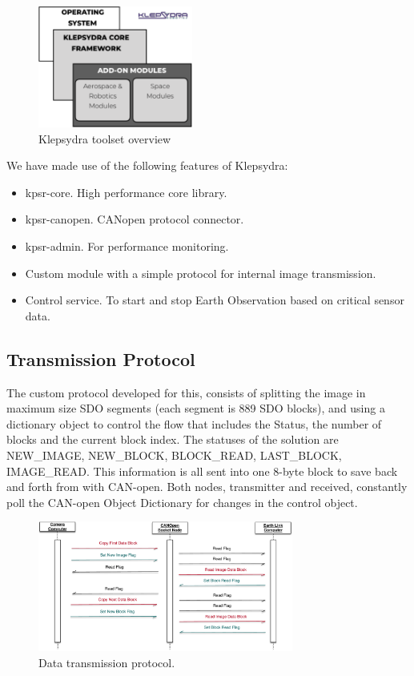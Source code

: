 \documentclass[a4paper,twocolumn]{esapub2005} %
\begin{document}
\begin{figure}[!h]
\centering
\includegraphics[width = 2in]{images/klepsydra_overview}
\caption{Klepsydra toolset overview\label{fig:kpsr_over}}
\end{figure}

We have made use of the following features of Klepsydra:

\begin{itemize}
\item kpsr-core. High performance core library.
\item kpsr-canopen. CANopen protocol connector.
\item kpsr-admin. For performance monitoring.
\item Custom module with a simple protocol for internal image transmission.
\item Control service. To start and stop Earth Observation based on critical sensor data.
\end{itemize}

\subsection{Transmission Protocol}
The custom protocol developed for this, consists of splitting the image in maximum size SDO segments (each segment is 889 SDO blocks), and using a dictionary object to control the flow that includes the Status, the number of blocks and the current block index. The statuses of the solution are NEW\_IMAGE, NEW\_BLOCK, BLOCK\_READ, LAST\_BLOCK, IMAGE\_READ. This information is all sent into one 8-byte block to save back and forth from with CAN-open. Both nodes, transmitter and received, constantly poll the CAN-open Object Dictionary for changes in the control object.

\begin{figure} [H]
\hspace*{-0.3cm}  
\includegraphics[width = 3.3in]{images/canopen_img_tx_protocol}
\caption{Data transmission protocol.\label{fig:canopen_img_tx_protocol}}
\end{figure}
\end{document}
